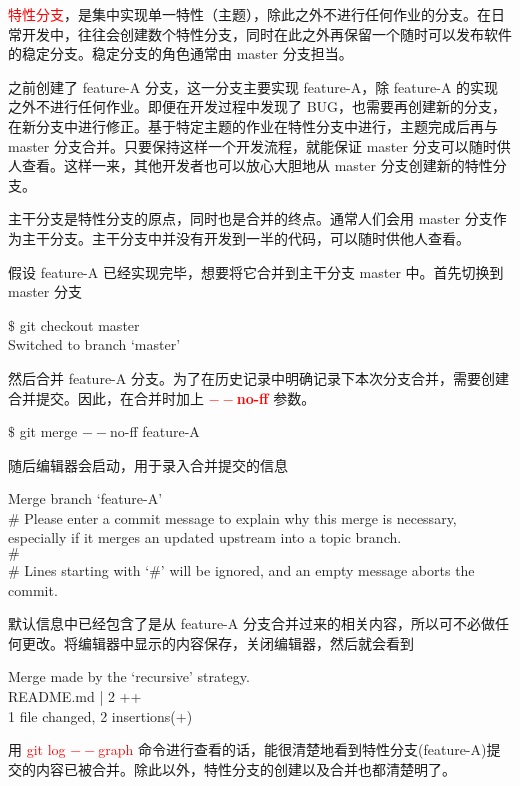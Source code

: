 \documentclass[12pt,a4paper]{article}
\begin{document}
\textcolor{red}{特性分支}，是集中实现单一特性（主题），除此之外不进行任何作业的分支。在日常开发中，往往会创建数个特性分支，同时在此之外再保留一个随时可以发布软件的稳定分支。稳定分支的角色通常由 master 分支担当。

之前创建了 feature-A 分支，这一分支主要实现 feature-A，除 feature-A 的实现之外不进行任何作业。即便在开发过程中发现了 BUG，也需要再创建新的分支，在新分支中进行修正。基于特定主题的作业在特性分支中进行，主题完成后再与 master 分支合并。只要保持这样一个开发流程，就能保证 master 分支可以随时供人查看。这样一来，其他开发者也可以放心大胆地从 master 分支创建新的特性分支。


主干分支是特性分支的原点，同时也是合并的终点。通常人们会用 master 分支作为主干分支。主干分支中并没有开发到一半的代码，可以随时供他人查看。

假设 feature-A 已经实现完毕，想要将它合并到主干分支 master 中。首先切换到 master 分支
\begin{tcolorbox}[colback=green!5,colframe=green!40!black,title= ]
$\$$ git checkout master \\
Switched to branch `master'
\end{tcolorbox}
然后合并 feature-A 分支。为了在历史记录中明确记录下本次分支合并，需要创建合并提交。因此，在合并时加上 \textcolor{red}{\bf $--$no-ff} 参数。
\begin{tcolorbox}[colback=green!5,colframe=green!40!black,title= ]
$\$$ git merge $--$no-ff feature-A
\end{tcolorbox}
随后编辑器会启动，用于录入合并提交的信息
\begin{tcolorbox}[colback=green!5,colframe=green!40!black,title= ]
Merge branch `feature-A' \\
$\#$ Please enter a commit message to explain why this merge is necessary, especially if it merges an updated upstream into a topic branch. \\
$\#$ \\
$\#$ Lines starting with `$\#$' will be ignored, and an empty message aborts the commit.
\end{tcolorbox}
默认信息中已经包含了是从 feature-A 分支合并过来的相关内容，所以可不必做任何更改。将编辑器中显示的内容保存，关闭编辑器，然后就会看到
\begin{tcolorbox}[colback=green!5,colframe=green!40!black,title= ]
Merge made by the `recursive' strategy. \\
README.md | 2 ++ \\
1 file changed, 2 insertions(+)
\end{tcolorbox}
用 \textcolor{red}{git log $--$graph} 命令进行查看的话，能很清楚地看到特性分支(feature-A)提交的内容已被合并。除此以外，特性分支的创建以及合并也都清楚明了。
\end{document}
